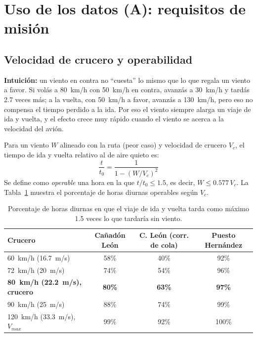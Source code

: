 \documentclass[11pt]{article}
\begin{document}
\section{Uso de los datos (A): requisitos de misión}
\label{sec:uso-mision}

\subsection{Velocidad de crucero y operabilidad}

\textbf{Intuición:} un viento en contra no ``cuesta'' lo mismo que lo que
regala un viento a favor. Si volás a 80~km/h con 50~km/h en contra, avanzás
a 30~km/h y tardás 2.7 veces más; a la vuelta, con 50~km/h a favor, avanzás a
130~km/h, pero eso no compensa el tiempo perdido a la ida. Por eso el viento
siempre alarga un viaje de ida y vuelta, y el efecto crece muy rápido cuando
el viento se acerca a la velocidad del avión.

Para un viento $W$ alineado con la ruta (peor caso) y velocidad de crucero
$V_c$, el tiempo de ida y vuelta relativo al de aire quieto es:
\begin{equation}
\frac{t}{t_0} = \frac{1}{1-(W/V_c)^2}
\label{eq:ida-vuelta}
\end{equation}
Se define como \emph{operable} una hora en la que $t/t_0\leq1.5$, es decir,
$W\leq0.577\,V_c$. La Tabla~\ref{tab:operabilidad} muestra el porcentaje de
horas diurnas operables según $V_c$.

\begin{table}[H]
\centering
\small
\begin{tabular}{@{}lccc@{}}
\toprule
Crucero & Cañadón León & C. León (corr. de cola) & Puesto Hernández \\
\midrule
60~km/h (16.7~m/s) & 58\% & 40\% & 92\% \\
72~km/h (20~m/s) & 74\% & 54\% & 96\% \\
\textbf{80~km/h (22.2~m/s), crucero} & \textbf{80\%} & \textbf{63\%} & \textbf{97\%} \\
90~km/h (25~m/s) & 88\% & 74\% & 99\% \\
120~km/h (33.3~m/s), $V_{max}$ & 99\% & 92\% & 100\% \\
\bottomrule
\end{tabular}
\caption{Porcentaje de horas diurnas en que el viaje de ida y vuelta tarda
como máximo 1.5 veces lo que tardaría sin viento.}
\label{tab:operabilidad}
\end{table}
\end{document}
